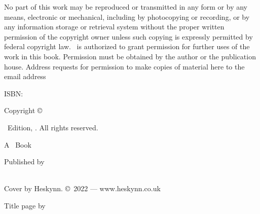 \singlespacing
\thispagestyle{empty}
\null
\vfill
{\parindent0pt
No part of this work may be reproduced or transmitted in any form or by any means, electronic or mechanical, including by photocopying or recording, or by any information storage or retrieval system without the proper written permission of the copyright owner unless such copying is expressly permitted by federal copyright law. \Publisher\ is authorized to grant permission for further uses of the work in this book. Permission must be obtained by the author or the publication house. Address requests for permission to make copies of material here to the email address \PublisherEmail

\vspace{1ex}

ISBN: \ISBN

\vspace{1ex}

\textsc{\FullTitle}

\vspace{1ex}

Copyright \copyright\ \Year\ \Publisher

\vspace{1ex}

\Edition\ Edition, \Year. All rights reserved.

\vspace{1ex}

A \Publisher\ Book

\vspace{1ex}

Published by \Publisher\\
\PublisherURL\\
\PublisherLocation

\vspace{1ex}

\PublisherEmail

\vspace{1ex}

Cover by Heskynn. \copyright\ 2022 --- www.heskynn.co.uk

Title page by 
}%

\clearpage
